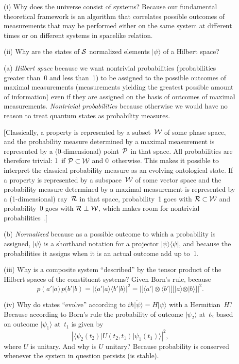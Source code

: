 \documentclass[12pt]{article}
\newcommand{\bra}[1]{\langle#1\vert}
\newcommand{\ket}[1]{\vert#1\rangle}
\newcommand{\braket}[2]{\langle#1\vert#2\rangle}
\newcommand{\ketbra}[2]{\vert#1\rangle\langle#2\vert}
\newcommand\sandwich[3]{\langle#1\vert#2\vert#3\rangle}
\newcommand{\be}{\begin{equation}}
\newcommand{\ee}{\end{equation}}
\newcommand{\cS}{{\cal S}}
\newcommand{\cP}{{\cal P}}
\newcommand{\W}{{\cal W}}
\newcommand{\R}{{\cal R}}
\begin{document}
\begin{enumerate}
\item[(i)] Why does the universe consist of systems? Because our fundamental 
theoretical framework is an algorithm that correlates possible outcomes of 
measurements that may be performed either on the same system at different 
times or on different systems in spacelike relation.

\smallskip
\item[(ii)] Why are the states of $\cS$ normalized elements $\ket\psi$ of a 
Hilbert space?

\smallskip
(a) {\it Hilbert space\/} because we want nontrivial probabilities (probabilities 
greater than~0 and less than~1) to be assigned to the possible outcomes of 
maximal measurements (measurements yielding the greatest possible amount of 
information) even if they are assigned on the basis of outcomes of maximal 
measurements. {\it Nontrivial probabilities\/} because otherwise we would have 
no reason to treat quantum states as probability measures.

[Classically, a property is represented by a subset~$\W$ of some phase space, 
and the probability measure determined by a maximal measurement is 
represented by a (0-dimensional) point~$\cP$ in that space. All probabilities are 
therefore trivial: 1~if $\cP\subset\W$ and 0~otherwise. This makes it possible 
to interpret the classical probability measure as an evolving ontological state. If a 
property is represented by a subspace~$\W$ of some vector space and the 
probability measure determined by a maximal measurement is represented by a 
(1-dimensional) ray~$\R$ in that space, probability~1 goes with $\R\subset\W$ 
and probability~0 goes with $\R\perp\W$, which makes room for nontrivial 
probabilities~\cite{justso,IUCAA}.]

\smallskip
(b) {\it Normalized\/} because as a possible outcome to which a probability is 
assigned, $\ket\psi$ is a shorthand notation for a projector $\ketbra\psi\psi$, 
and because the probabilities it assigns when it is an actual outcome add up to~1.

\smallskip
\item[(iii)] Why is a composite system ``described'' by the tensor product of the 
Hilbert spaces of the constituent systems? Given Born's rule, because
\be
p(a'|a)\,p(b'|b)=|\braket{a'}{a}\braket{b'}{b}|^2=
\left|\bigl[\bra{a'}\otimes\bra{b'}\bigr]
\bigl[\ket{a}\otimes\ket{b}\bigr]\right|^2.
\ee
\item[(iv)] Why do states ``evolve'' according to $i\hbar\ket{\dot 
\psi}=H\ket\psi$ with a Hermitian~$H$? Because according to Born's rule the 
probability of outcome $\ket{\psi_2}$ at~$t_2$ based on outcome 
$\ket{\psi_1}$ at~$t_1$ is given by
\be
|\sandwich{\psi_2(t_2)}{U(t_2,t_1)}{\psi_1(t_1)}|^2,
\ee
where $U$ is unitary. And why is $U$ unitary? Because probability is conserved 
whenever the system in question persists (is stable).
\end{enumerate}
\end{document}
